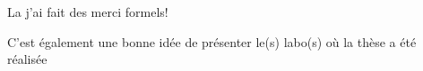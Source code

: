 La j'ai fait des merci formels!

C'est également une bonne idée de présenter le(s) labo(s) où la thèse a
été réalisée

